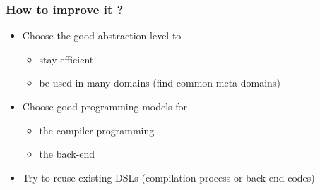 \documentclass{beamer}
\begin{document}
\begin{frame}
\frametitle{How to improve it ?} %
\begin{itemize}
\item Choose the good abstraction level to
\begin{itemize}
\item stay efficient
\item be used in many domains (find common meta-domains)
\end{itemize}
\item Choose good programming models for
\begin{itemize}
\item the compiler programming
\item the back-end
\end{itemize}
\item Try to reuse existing DSLs (compilation process or back-end codes)
\end{itemize}
\end{frame}

\end{document}

